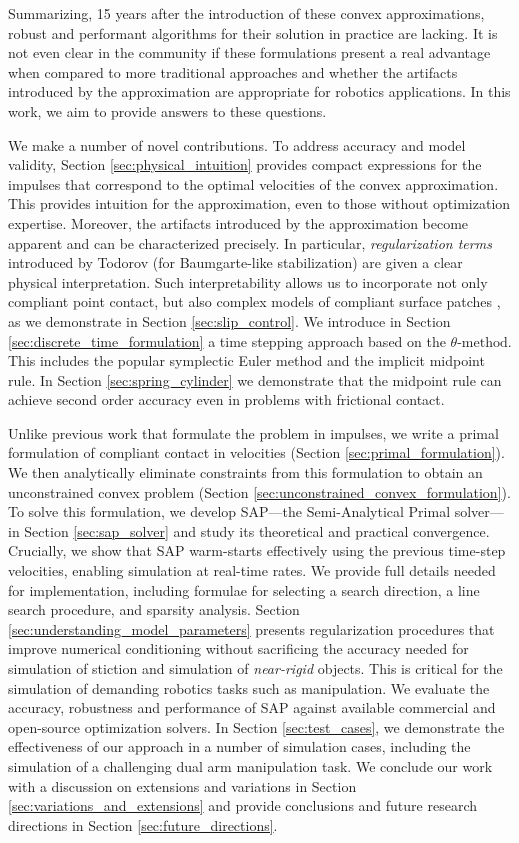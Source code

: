 Summarizing, 15 years after the introduction of these convex
approximations, robust and performant algorithms for their solution in practice
are lacking. It is not even clear in the community if these formulations present
a real advantage when compared to more traditional approaches and whether the
artifacts introduced by the approximation are appropriate for robotics
applications. In this work, we aim to provide answers to these questions. 

We make a number of novel contributions. To address accuracy and model validity,
Section \ref{sec:physical_intuition} provides compact expressions for the
impulses that correspond to the optimal velocities of the convex approximation.
This provides intuition for the approximation, even to those without
optimization expertise. Moreover, the artifacts introduced by the approximation
become apparent and can be characterized precisely. In particular,
\emph{regularization terms} introduced by Todorov \cite{bib:todorov2014} (for
Baumgarte-like stabilization) are given a clear physical interpretation. Such
interpretability  allows us to incorporate not only compliant point contact, but
also complex models of compliant surface patches \cite{bib:elandt2019pressure},
as we demonstrate in Section \ref{sec:slip_control}. We introduce in Section
\ref{sec:discrete_time_formulation} a time stepping approach based on the
$\theta\text{-method}$. This includes the popular symplectic Euler method and
the implicit midpoint rule. In Section \ref{sec:spring_cylinder} we demonstrate
that the midpoint rule can achieve second order accuracy even in problems with
frictional contact.

Unlike previous work \cite{bib:anitescu2010,bib:todorov2014} that formulate the
problem in impulses, we write a primal formulation of compliant contact
in velocities (Section \ref{sec:primal_formulation}). We then analytically eliminate constraints from this
formulation to obtain an unconstrained convex problem (Section \ref{sec:unconstrained_convex_formulation}).
To solve this formulation, we develop SAP---the Semi-Analytical Primal  solver---in Section \ref{sec:sap_solver} and study its theoretical and practical
 convergence.  Crucially, we show that SAP warm-starts effectively
using the previous time-step velocities, enabling simulation at real-time rates.  We provide full details needed for implementation,
including formulae for selecting a search direction,
a line search procedure, and sparsity analysis. Section
\ref{sec:understanding_model_parameters} presents 
 regularization procedures that improve numerical
 conditioning without sacrificing the accuracy needed
 for simulation of stiction and simulation of \emph{near-rigid} objects.
This is critical for the simulation of demanding robotics tasks such as
manipulation. We evaluate the accuracy, robustness and performance of SAP
against available commercial and open-source optimization solvers. In Section
\ref{sec:test_cases}, we demonstrate the effectiveness of our approach in a
number of simulation cases, including the simulation of a challenging dual arm
manipulation task. We conclude our work with a discussion on extensions and
variations in Section \ref{sec:variations_and_extensions} and provide
conclusions and future research directions in Section
\ref{sec:future_directions}.
